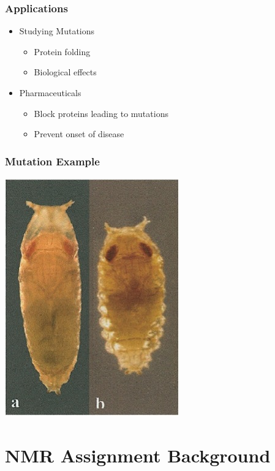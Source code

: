 \documentclass{beamer}
\begin{document}
\begin{frame}
	\frametitle{Applications}
    \begin{itemize}
    	\item Studying Mutations
    	\begin{itemize}
    		\item Protein folding
    		\item Biological effects
    	\end{itemize}
    	\vspace{12pt}
    	\item Pharmaceuticals
    	\begin{itemize}
    		\item Block proteins leading to mutations
    		\item Prevent onset of disease
    	\end{itemize}
    \end{itemize}
\end{frame}

\begin{frame}
	\frametitle{Mutation Example}
    \vspace{-.5cm}
	\center
	\includegraphics[width=.4\textwidth]{fruit}
\end{frame}

\section{NMR Assignment Background}
\end{document}
